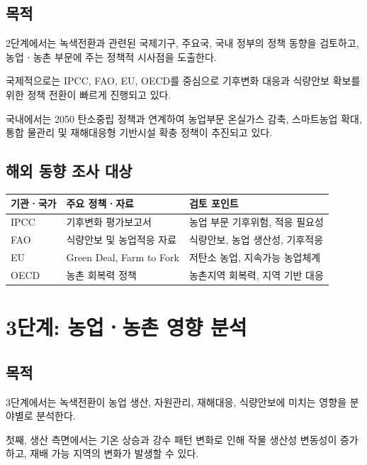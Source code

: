 \documentclass[11pt,a4paper]{article}
\begin{document}
\subsection*{목적}

2단계에서는 녹색전환과 관련된 국제기구, 주요국, 국내 정부의 정책 동향을 검토하고,
농업ㆍ농촌 부문에 주는 정책적 시사점을 도출한다.

국제적으로는 IPCC, FAO, EU, OECD를 중심으로
기후변화 대응과 식량안보 확보를 위한 정책 전환이 빠르게 진행되고 있다.

국내에서는 2050 탄소중립 정책과 연계하여
농업부문 온실가스 감축, 스마트농업 확대,
통합 물관리 및 재해대응형 기반시설 확충 정책이 추진되고 있다.

\subsection*{해외 동향 조사 대상}

\begin{table}[h]
\centering
\renewcommand{\arraystretch}{1.3}
\begin{tabular}{p{4cm} p{5cm} p{5cm}}
\toprule
\rowcolor{gray!20}
기관ㆍ국가 & 주요 정책ㆍ자료 & 검토 포인트 \\
\midrule
IPCC & 기후변화 평가보고서 & 농업 부문 기후위험, 적응 필요성 \\
FAO & 식량안보 및 농업적응 자료 & 식량안보, 농업 생산성, 기후적응 \\
EU & Green Deal, Farm to Fork & 저탄소 농업, 지속가능 농업체계 \\
OECD & 농촌 회복력 정책 & 농촌지역 회복력, 지역 기반 대응 \\
\bottomrule
\end{tabular}
\end{table}

\section*{3단계: 농업ㆍ농촌 영향 분석}

\subsection*{목적}

3단계에서는 녹색전환이 농업 생산, 자원관리, 재해대응, 식량안보에 미치는 영향을
분야별로 분석한다.

첫째, 생산 측면에서는 기온 상승과 강수 패턴 변화로 인해
작물 생산성 변동성이 증가하고,
재배 가능 지역의 변화가 발생할 수 있다.
\end{document}
